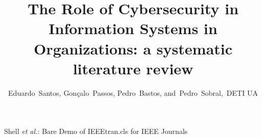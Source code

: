 \documentclass[journal]{IEEEtran}
\begin{document}
%
\title{The Role of Cybersecurity in Information Systems in Organizations: a systematic literature review}
%
%
%


\author{Eduardo~Santos,
        Gonçalo~Passos,
        Pedro~Bastos,
        and~Pedro~Sobral,~DETI UA%
}

% 
%



%
{Shell \MakeLowercase{\textit{et al.}}: Bare Demo of IEEEtran.cls for IEEE Journals}
% 
\end{document}
